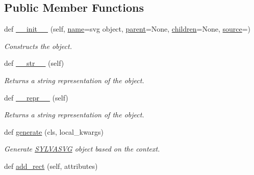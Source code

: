 \subsection*{Public Member Functions}
\begin{DoxyCompactItemize}
\item 
def \hyperlink{classsylva_1_1base_1_1sylva__base_1_1_s_y_l_v_a_s_v_g_a6e199f060579bb2fa9eb8c9fca634b30}{\+\_\+\+\_\+init\+\_\+\+\_\+} (self, \hyperlink{classsylva_1_1base_1_1sylva__base_1_1_s_y_l_v_a_s_v_g_a645228e918333f1037984d6169079449}{name}=\textquotesingle{}svg object\textquotesingle{}, \hyperlink{classsylva_1_1base_1_1sylva__base_1_1_s_y_l_v_a_s_v_g_af54d51249c7dbb6841eb5f9dae5da94e}{parent}=None, \hyperlink{classsylva_1_1base_1_1sylva__base_1_1_s_y_l_v_a_s_v_g_a29eb878cbd3a0f1bae165da83d1447d4}{children}=None, \hyperlink{classsylva_1_1base_1_1sylva__base_1_1_s_y_l_v_a_s_v_g_aec2c2d79509fc5b5285ed6dad631a11e}{source}=\textquotesingle{}\textquotesingle{})
\begin{DoxyCompactList}\small\item\em Constructs the object. \end{DoxyCompactList}\item 
def \hyperlink{classsylva_1_1base_1_1sylva__base_1_1_s_y_l_v_a_s_v_g_a944c2c455e17e8500cb6df4fcbf1a21c}{\+\_\+\+\_\+str\+\_\+\+\_\+} (self)
\begin{DoxyCompactList}\small\item\em Returns a string representation of the object. \end{DoxyCompactList}\item 
def \hyperlink{classsylva_1_1base_1_1sylva__base_1_1_s_y_l_v_a_s_v_g_a6f5c803748482cc149e0037405c9f130}{\+\_\+\+\_\+repr\+\_\+\+\_\+} (self)
\begin{DoxyCompactList}\small\item\em Returns a string representation of the object. \end{DoxyCompactList}\item 
def \hyperlink{classsylva_1_1base_1_1sylva__base_1_1_s_y_l_v_a_s_v_g_ae0e18ce2b9be0def86deee37cffbb8a7}{generate} (cls, local\+\_\+kwargs)
\begin{DoxyCompactList}\small\item\em Generate \hyperlink{classsylva_1_1base_1_1sylva__base_1_1_s_y_l_v_a_s_v_g}{S\+Y\+L\+V\+A\+S\+VG} object based on the context. \end{DoxyCompactList}\item 
def \hyperlink{classsylva_1_1base_1_1sylva__base_1_1_s_y_l_v_a_s_v_g_ab26401da507c1041bc8445bb31bfcd1d}{add\+\_\+rect} (self, attributes)

\end{DoxyCompactItemize}

